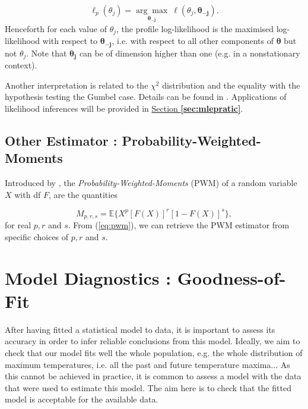 \begin{equation}
\ell_p(\theta_j)=\underset{\boldsymbol{\theta_{-j}}}{\mathrm{\arg\max}}\ \ell (\theta_j,\boldsymbol{\theta_{-j}}).
\end{equation}
Henceforth for each value of $\theta_j$, the profile log-likelihood is the maximised 
log-likelihood with respect to $\boldsymbol{\theta_{-j}}$, i.e. with respect to all other 
components of $\boldsymbol{\theta}$ but not $\theta_j$. Note that $\boldsymbol{\theta_j}$ can be of dimension higher than one (e.g. in a nonstationary context).

Another interpretation is related to the $\chi^2$ distribution and the equality with the hypothesis testing the Gumbel case. Details can be found in \citet[pp.138]{beirlant_statistics_2006}. Applications of likelihood inferences will be provided in \hyperref[sec:mlepratic]{Section \textbf{\ref{sec:mlepratic}}}.



\subsection{Other Estimator :  Probability-Weighted-Moments}\label{sec:gevother}

Introduced by \citet{greenwood_probability_1979}, the \emph{Probability-Weighted-Moments} (PWM) of a random variable $X$ with df $F$, are the quantities 

\begin{equation}\label{eq:pwm}
M_{p,r,s}=\mathbb{E}\Big\{X^p[F(X)]^r[1-F(X)]^s\Big\},
\end{equation}
for real $p,r$ and $s$. From (\ref{eq:pwm}), we can retrieve the PWM estimator from specific choices of $p,r$ and $s$.



\section{Model Diagnostics : Goodness-of-Fit}\label{sec:diag}

After having fitted a statistical model to data, it is important to assess its accuracy in order to infer reliable conclusions from this model.
Ideally, we aim to check that our model fits well the whole population, e.g. the whole distribution of maximum temperatures, i.e. all the past and future temperature maxima... As this cannot be achieved in practice, it is common to assess a model with the data that were used to estimate this model. The aim here is to check that the fitted model is acceptable for the available data. 

